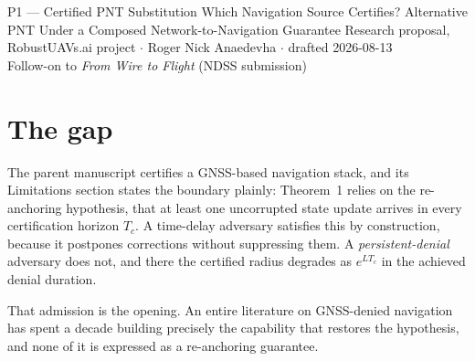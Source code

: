 \documentclass[11pt,a4paper]{article}
\begin{document}
\proposalheader
  {P1 --- Certified PNT Substitution}
  {Which Navigation Source Certifies? Alternative PNT Under a Composed
   Network-to-Navigation Guarantee}
  {Research proposal, RobustUAVs.ai project $\cdot$ Roger Nick Anaedevha $\cdot$
   drafted 2026-08-13\\
   Follow-on to \emph{From Wire to Flight} (NDSS submission)}

\begin{abstract}
\noindent
The parent manuscript proves that a network detector's operating point
$\theta$ bounds a certified Mission-Completion-Rate floor, and finds
empirically that the decisive quantity is not the proof but the
\emph{interface}: $\gamma$, the metres of position error accrued per second of
degraded navigation input. This proposal observes that $\gamma$ is a property
of the \emph{navigation source}, not of the attack. Changing the
positioning--navigation--timing (PNT) modality therefore moves the certified
window without altering a line of the proof. We propose to measure $\gamma$ per
modality, to show that a cryptographically authenticated PNT source discharges
the re-anchoring hypothesis the parent theorem currently assumes, and to derive
from the certificate a sensor-selection rule: the minimal sensor suite whose
fused $\gamma$ keeps a given detector setting inside the certified window.
\end{abstract}

\section{The gap}
The parent manuscript certifies a GNSS-based navigation stack, and its
Limitations section states the boundary plainly: Theorem~1 relies on the
re-anchoring hypothesis, that at least one uncorrupted state update arrives in
every certification horizon $T_c$. A time-delay adversary satisfies this by
construction, because it postpones corrections without suppressing them. A
\emph{persistent-denial} adversary does not, and there the certified radius
degrades as $e^{L T_c}$ in the achieved denial duration.

That admission is the opening. An entire literature on GNSS-denied navigation
has spent a decade building precisely the capability that restores the
hypothesis, and none of it is expressed as a re-anchoring
guarantee.
\end{document}
